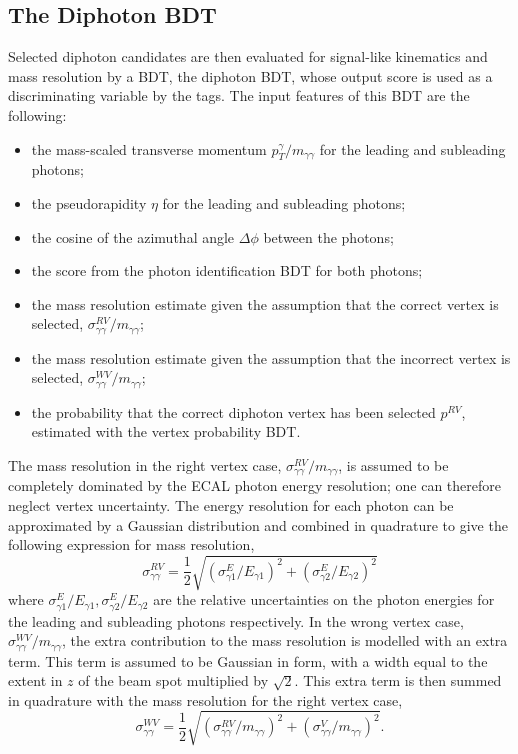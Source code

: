 \subsection{The Diphoton BDT}
Selected diphoton candidates are then evaluated for signal-like kinematics and mass resolution by a BDT, the diphoton BDT, whose output score is used as a discriminating variable by the tags.
The input features of this BDT are the following:
\begin{itemize}[noitemsep]
    \item the mass-scaled transverse momentum $p^{\gamma}_{T}/m_{\gamma\gamma}$ for the leading and subleading photons;
    \item the pseudorapidity $\eta$ for the leading and subleading photons;
    \item the cosine of the azimuthal angle $\Delta\phi$ between the photons;
    \item the score from the photon identification BDT for both photons;
    \item the mass resolution estimate given the assumption that the correct vertex is selected, $\sigma^{RV}_{\gamma\gamma}/m_{\gamma\gamma}$;
    \item the mass resolution estimate given the assumption that the incorrect vertex is selected, $\sigma^{WV}_{\gamma\gamma}/m_{\gamma\gamma}$;
    \item the probability that the correct diphoton vertex has been selected $p^{RV}$, estimated with the vertex probability BDT.
\end{itemize}

The mass resolution in the right vertex case, $\sigma^{RV}_{\gamma\gamma}/m_{\gamma\gamma}$, is assumed to be completely dominated by the ECAL photon energy resolution; one can therefore neglect vertex uncertainty. The energy resolution for each photon can be approximated by a Gaussian distribution and combined in quadrature to give the following expression for mass resolution,
\begin{equation}
    \sigma^{RV}_{\gamma\gamma} = \frac{1}{2}\sqrt{(\sigma^{E}_{\gamma{1}}/E_{\gamma{1}})^2 + (\sigma^{E}_{\gamma{2}}/E_{\gamma{2}})^2}
\end{equation} 
where $\sigma^{E}_{\gamma{1}}/E_{\gamma{1}}, \sigma^{E}_{\gamma{2}}/E_{\gamma{2}}$ are the relative uncertainties on the photon energies for the leading and subleading photons respectively. 
In the wrong vertex case, $\sigma^{WV}_{\gamma\gamma}/m_{\gamma\gamma}$, the extra contribution to the mass resolution is modelled with an extra term. This term is assumed to be Gaussian in form, with a width equal to the extent in $z$ of the beam spot multiplied by $\sqrt{2}$. This extra term is then summed in quadrature with the mass resolution for the right vertex case,
\begin{equation}
    \sigma^{WV}_{\gamma\gamma} = \frac{1}{2}\sqrt{(\sigma^{RV}_{\gamma\gamma}/m_{\gamma\gamma})^2 + (\sigma^{V}_{\gamma\gamma}/m_{\gamma\gamma})^2}.
\end{equation} 


